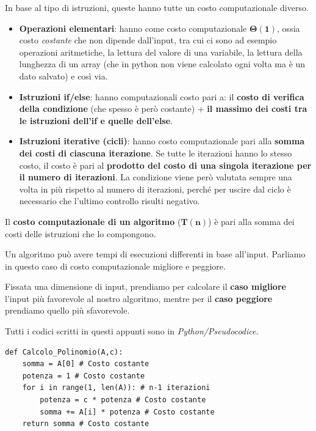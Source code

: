 \documentclass[11pt, a4paper, titlepage, oneside]{scrbook}
\begin{document}
In base al tipo di istruzioni, queste hanno tutte un costo computazionale diverso.

\begin{itemize}
    \item \textbf{Operazioni elementari}: hanno come costo computazionale $\bm{\Theta(1)}$, ossia costo \textit{costante} che non dipende dall'input, tra cui ci sono  ad esempio operazioni aritmetiche, la lettura del valore di una variabile, la lettura della lunghezza di un array (che in python non viene calcolato ogni volta ma è un dato salvato) e così via.
    \item \textbf{Istruzioni if/else}: hanno computazionali costo pari a: il \textbf{costo di verifica della condizione} (che spesso è però costante) + \textbf{il massimo dei costi tra le istruzioni dell'if e quelle dell'else}.
    \item \textbf{Istruzioni iterative (cicli)}: hanno costo computazionale pari alla \textbf{somma dei costi di ciascuna iterazione}. Se tutte le iterazioni hanno lo stesso costo, il costo è pari al \textbf{prodotto del costo di una singola iterazione per il numero di iterazioni}. La condizione viene però valutata sempre una volta in più rispetto al numero di iterazioni, perché per uscire dal ciclo è necessario che l'ultimo controllo risulti negativo.
\end{itemize}

\begin{Definizione}
\label{def-costo-computazionale-algoritmo}
Il \textbf{costo computazionale di un algoritmo} ($\bm{T(n)}$) è pari alla somma dei costi delle istruzioni che lo compongono.
\end{Definizione}

Un algoritmo può avere tempi di esecuzioni differenti in base all'input. Parliamo in questo caso di costo computazionale migliore e peggiore.

\begin{Definizione}
\label{def-caso-migliore-peggiore}
Fissata una dimensione di input, prendiamo per calcolare il \textbf{caso migliore} l'input più favorevole al nostro algoritmo, mentre per il \textbf{caso peggiore} prendiamo quello più sfavorevole.
\end{Definizione}

\Esempi \nopagebreak

\NB Tutti i codici scritti in questi appunti sono in \textit{Python/Pseudocodice}.

\begin{lstlisting}[style=Python]
def Calcolo_Polinomio(A,c): 
    somma = A[0] # Costo costante
    potenza = 1 # Costo costante
    for i in range(1, len(A)): # n-1 iterazioni
        potenza = c * potenza # Costo costante
        somma += A[i] * potenza # Costo costante
    return somma # Costo costante
\end{lstlisting}
\end{document}

